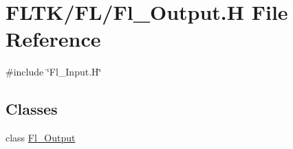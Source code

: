 \hypertarget{_fl___output_8_h}{}\section{F\+L\+T\+K/\+F\+L/\+Fl\+\_\+\+Output.H File Reference}
\label{_fl___output_8_h}
{\ttfamily \#include \char`\"{}Fl\+\_\+\+Input.\+H\char`\"{}}\newline
\subsection*{Classes}
\begin{DoxyCompactItemize}
\item 
class \hyperlink{class_fl___output}{Fl\+\_\+\+Output}
\end{DoxyCompactItemize}
